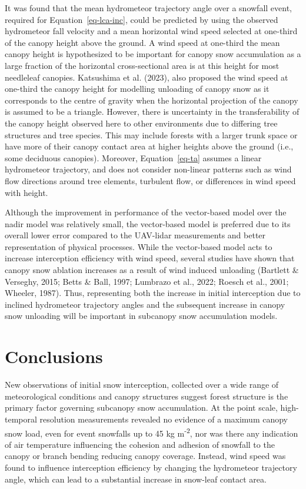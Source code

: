 \documentclass[
  letterpaper,
  DIV=11,
  numbers=noendperiod]{scrartcl}
\begin{document}
It was found that the mean hydrometeor trajectory angle over a snowfall
event, required for Equation~\ref{eq-lca-inc}, could be predicted by
using the observed hydrometeor fall velocity and a mean horizontal wind
speed selected at one-third of the canopy height above the ground. A
wind speed at one-third the mean canopy height is hypothesized to be
important for canopy snow accumulation as a large fraction of the
horizontal cross-sectional area is at this height for most needleleaf
canopies. Katsushima et al. (2023), also proposed the wind speed at
one-third the canopy height for modelling unloading of canopy snow as it
corresponds to the centre of gravity when the horizontal projection of
the canopy is assumed to be a triangle. However, there is uncertainty in
the transferability of the canopy height observed here to other
environments due to differing tree structures and tree species. This may
include forests with a larger trunk space or have more of their canopy
contact area at higher heights above the ground (i.e., some deciduous
canopies). Moreover, Equation~\ref{eq-ta} assumes a linear hydrometeor
trajectory, and does not consider non-linear patterns such as wind flow
directions around tree elements, turbulent flow, or differences in wind
speed with height.

Although the improvement in performance of the vector-based model over
the nadir model was relatively small, the vector-based model is
preferred due to its overall lower error compared to the UAV-lidar
measurements and better representation of physical processes. While the
vector-based model acts to increase interception efficiency with wind
speed, several studies have shown that canopy snow ablation increases as
a result of wind induced unloading (Bartlett \& Verseghy, 2015; Betts \&
Ball, 1997; Lumbrazo et al., 2022; Roesch et al., 2001; Wheeler, 1987).
Thus, representing both the increase in initial interception due to
inclined hydrometeor trajectory angles and the subsequent increase in
canopy snow unloading will be important in subcanopy snow accumulation
models.

\section{Conclusions}\label{conclusions}

New observations of initial snow interception, collected over a wide
range of meteorological conditions and canopy structures suggest forest
structure is the primary factor governing subcanopy snow accumulation.
At the point scale, high-temporal resolution measurements revealed no
evidence of a maximum canopy snow load, even for event snowfalls up to
45 kg m\textsuperscript{-2}, nor was there any indication of air
temperature influencing the cohesion and adhesion of snowfall to the
canopy or branch bending reducing canopy coverage. Instead, wind speed
was found to influence interception efficiency by changing the
hydrometeor trajectory angle, which can lead to a substantial increase
in snow-leaf contact area.
\end{document}
